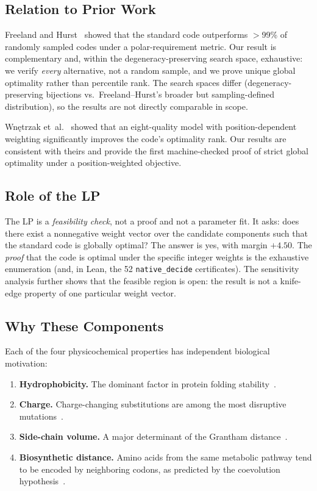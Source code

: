 \documentclass[11pt,twocolumn]{article}
\begin{document}
\subsection{Relation to Prior Work}

Freeland and Hurst~\cite{FreelandHurst1998} showed that the standard code
outperforms $>$99\% of randomly sampled codes under a polar-requirement
metric. Our result is complementary and, within the degeneracy-preserving
search space, exhaustive: we verify \emph{every} alternative, not a
random sample, and we prove unique global optimality rather than
percentile rank. The search spaces differ (degeneracy-preserving
bijections vs.\ Freeland--Hurst's broader but sampling-defined
distribution), so the results are not directly comparable in scope.

Wnętrzak et~al.~\cite{Wnetrzak2018} showed that an eight-quality model
with position-dependent weighting significantly improves the code's
optimality rank. Our results are consistent with theirs and provide the
first machine-checked proof of strict global optimality under a
position-weighted objective.

\subsection{Role of the LP}

The LP is a \emph{feasibility check}, not a proof and not a parameter fit.
It asks: does there exist a nonneg\-ative weight vector over the candidate
components such that the standard code is globally optimal? The answer is
yes, with margin $+4.50$. The \emph{proof} that the code is optimal under
the specific integer weights is the exhaustive enumeration (and, in Lean,
the 52 \texttt{native\_decide} certificates). The sensitivity analysis
further shows that the feasible region is open: the result is not a
knife-edge property of one particular weight vector.

\subsection{Why These Components}

Each of the four physicochemical properties has independent biological
motivation:

\begin{enumerate}
\item \textbf{Hydrophobicity.} The dominant factor in protein folding
  stability~\cite{KyteDoolittle1982}.
\item \textbf{Charge.} Charge-changing substitutions are among the most
  disruptive mutations~\cite{Grantham1974}.
\item \textbf{Side-chain volume.} A major determinant of the Grantham
  distance~\cite{Grantham1974}.
\item \textbf{Biosynthetic distance.} Amino acids from the same metabolic
  pathway tend to be encoded by neighboring codons, as predicted by the
  coevolution hypothesis~\cite{Wong1975}.
\end{enumerate}
\end{document}
